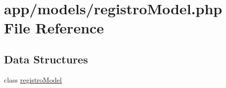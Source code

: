 \hypertarget{registro_model_8php}{}\section{app/models/registro\+Model.php File Reference}
\label{registro_model_8php}
\subsection*{Data Structures}
\begin{DoxyCompactItemize}
\item 
class \hyperlink{classregistro_model}{registro\+Model}
\end{DoxyCompactItemize}
